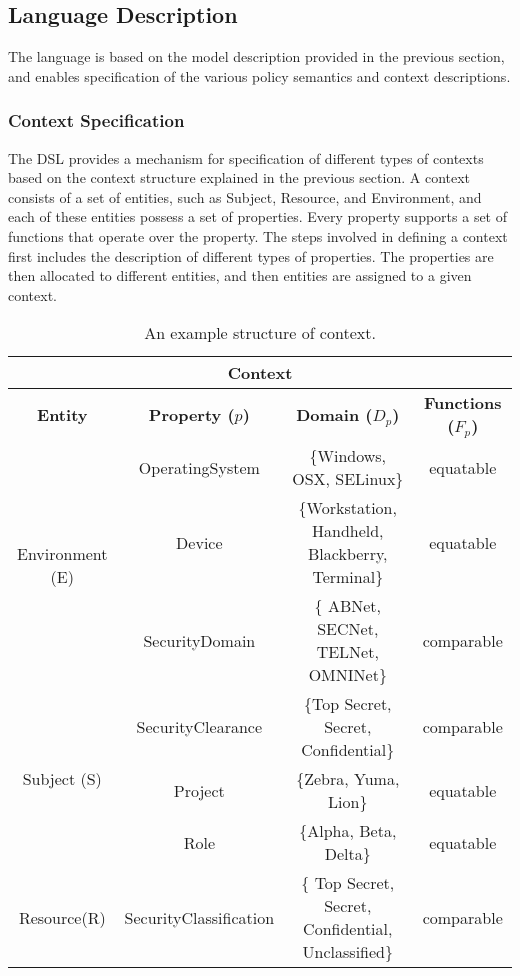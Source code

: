 \subsection{Language Description}
The language is based on the model description provided in the previous section, and enables specification of the various policy semantics and context descriptions. 

\vfill\eject
\subsubsection{Context Specification}
The DSL provides a mechanism for specification of different types of contexts based on the context structure explained in the previous section. A context consists of a set of entities, such as Subject, Resource, and Environment, and each of these entities possess a set of properties. Every property supports a set of functions that operate over the property. The steps involved in defining a context first includes the description of different types of properties. The properties are then allocated to different entities, and then entities are assigned to a given context. 

\begin{table*}[t]
\caption{An example structure of context.}
\label{table:context}
\begin{center}
\begin{tabular}{|c|c|c|c|}
\hline
\multicolumn{4}{|c|}{ \bf Context}\\
\hline
{ \bf Entity} & {\bf Property ($p$)} & { \bf Domain ($D_p$)} & {\bf Functions ($F_p$)}\\
\hline
\multirow{3}{*}{Environment (E)} & OperatingSystem & \{Windows, OSX, SELinux\}&  equatable\\
                                                    & Device & \{Workstation, Handheld, Blackberry, Terminal\} & equatable \\
                                                    & SecurityDomain & \{ ABNet, SECNet, TELNet, OMNINet\} & comparable\\ 
\hline
\multirow{3}{*}{Subject (S)} & SecurityClearance & \{Top Secret, Secret, Confidential\} &  comparable\\
				      &Project & \{Zebra, Yuma, Lion\} & equatable\\
				       &Role & \{Alpha, Beta, Delta\} & equatable\\

\hline
 Resource(R) & SecurityClassification & \{ Top Secret, Secret, Confidential, Unclassified\} & comparable \\
\hline

\end{tabular}
\end{center}
\label{default}
\end{table*} 

